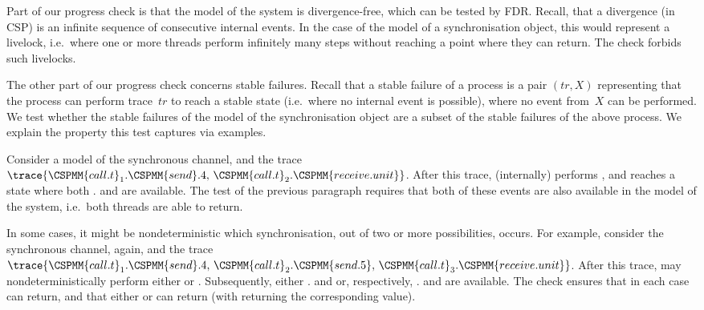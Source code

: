 Part of our progress check is that the model of the system is divergence-free,
which can be tested by FDR\@.  Recall, that a divergence (in CSP) is an
infinite sequence of consecutive internal events.  In the case of the model of
a synchronisation object, this would represent a livelock, i.e.~where one or
more threads perform infinitely many steps without reaching a point where
they can return.  The check forbids such livelocks.

The other part of our progress check concerns stable failures.  Recall that a
stable failure of a process is a pair $(tr,X)$ representing that the process
can perform trace~$tr$ to reach a stable state (i.e.~where no internal event
is possible), where no event from~$X$ can be performed.  We test whether the
stable failures of the model of the synchronisation object are a subset of the
stable failures of the above  process.  We explain the property
this test captures via examples.

Consider a model of the synchronous channel, and the trace
$\trace{\CSPMM{call.t}_1.\CSPMM{send}.4, \linebreak[1] \,
  \CSPMM{call.t}_2.\CSPMM{receive.unit}}$.  After this trace, 
(internally) performs , and
reaches a state where both . and
 are available.  The test of the previous
paragraph requires that both of these events are also available in the model
of the system, i.e.~both threads are able to return.

In some cases, it might be nondeterministic which synchronisation, out of two
or more possibilities, occurs.  For example, consider the synchronous channel,
again, and the trace $\trace{\CSPMM{call.t}_1.\CSPMM{send}.4,\,
  \CSPMM{call.t}_2.\CSPMM{send.5},\, \CSPMM{call.t}_3.\CSPMM{receive.unit}}$.
After this trace,  may nondeterministically perform either
\linebreak[1] or
.  Subsequently, either
. and  or,
respectively, . and 
are available.  The check ensures that in each case  can return,
and that either  or  can return (with 
returning the corresponding value).




